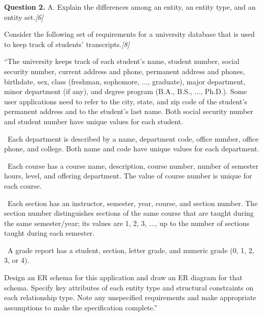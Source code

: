 \documentclass[11pt,a4paper]{article}
\newcommand{\pts}[1]{\hfill\textit{[#1]}}
\begin{document}
\medskip\noindent\textbf{Question 2.} A. Explain the differences among an entity, an entity type, and an entity set.\pts{6}
\begin{parts}
  \item Consider the following set of requirements for a university database that is used to keep track of students' transcripts.\pts{8}
  
  “The university keeps track of each student's name, student number, social security number, current address and phone, permanent address and phones, birthdate, sex, class (freshman, sophomore, $\dots$, graduate), major department, minor department (if any), and degree program (B.A., B.S., $\dots$, Ph.D.). Some user applications need to refer to the city, state, and zip code of the student's permanent address and to the student's last name. Both social security number and student number have unique values for each student.
  
  \textbullet\ Each department is described by a name, department code, office number, office phone, and college. Both name and code have unique values for each department.
  
  \textbullet\ Each course has a course name, description, course number, number of semester hours, level, and offering department. The value of course number is unique for each course.
  
  \textbullet\ Each section has an instructor, semester, year, course, and section number. The section number distinguishes sections of the same course that are taught during the same semester/year; its values are 1, 2, 3, $\dots$, up to the number of sections taught during each semester.
  
  \textbullet\ A grade report has a student, section, letter grade, and numeric grade (0, 1, 2, 3, or 4).
  
  Design an ER schema for this application and draw an ER diagram for that schema. Specify key attributes of each entity type and structural constraints on each relationship type. Note any unspecified requirements and make appropriate assumptions to make the specification complete.”
\end{parts}
\end{document}
